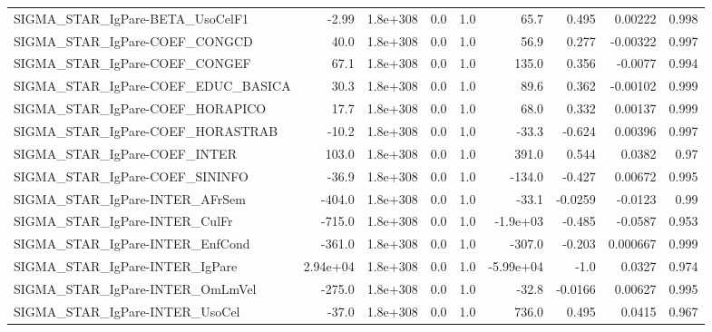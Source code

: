 \begin{tabular}{lrrrrrrrr}
SIGMA\_STAR\_IgPare-BETA\_UsoCelF1       &       -2.99 &     1.8e+308 &     0.0 &      1.0 &       65.7 &       0.495 &      0.00222 &         0.998 \\
SIGMA\_STAR\_IgPare-COEF\_CONGCD         &        40.0 &     1.8e+308 &     0.0 &      1.0 &       56.9 &       0.277 &     -0.00322 &         0.997 \\
SIGMA\_STAR\_IgPare-COEF\_CONGEF         &        67.1 &     1.8e+308 &     0.0 &      1.0 &      135.0 &       0.356 &      -0.0077 &         0.994 \\
SIGMA\_STAR\_IgPare-COEF\_EDUC\_BASICA    &        30.3 &     1.8e+308 &     0.0 &      1.0 &       89.6 &       0.362 &     -0.00102 &         0.999 \\
SIGMA\_STAR\_IgPare-COEF\_HORAPICO       &        17.7 &     1.8e+308 &     0.0 &      1.0 &       68.0 &       0.332 &      0.00137 &         0.999 \\
SIGMA\_STAR\_IgPare-COEF\_HORASTRAB      &       -10.2 &     1.8e+308 &     0.0 &      1.0 &      -33.3 &      -0.624 &      0.00396 &         0.997 \\
SIGMA\_STAR\_IgPare-COEF\_INTER          &       103.0 &     1.8e+308 &     0.0 &      1.0 &      391.0 &       0.544 &       0.0382 &          0.97 \\
SIGMA\_STAR\_IgPare-COEF\_SININFO        &       -36.9 &     1.8e+308 &     0.0 &      1.0 &     -134.0 &      -0.427 &      0.00672 &         0.995 \\
SIGMA\_STAR\_IgPare-INTER\_AFrSem        &      -404.0 &     1.8e+308 &     0.0 &      1.0 &      -33.1 &     -0.0259 &      -0.0123 &          0.99 \\
SIGMA\_STAR\_IgPare-INTER\_CulFr         &      -715.0 &     1.8e+308 &     0.0 &      1.0 &   -1.9e+03 &      -0.485 &      -0.0587 &         0.953 \\
SIGMA\_STAR\_IgPare-INTER\_EnfCond       &      -361.0 &     1.8e+308 &     0.0 &      1.0 &     -307.0 &      -0.203 &     0.000667 &         0.999 \\
SIGMA\_STAR\_IgPare-INTER\_IgPare        &    2.94e+04 &     1.8e+308 &     0.0 &      1.0 &  -5.99e+04 &        -1.0 &       0.0327 &         0.974 \\
SIGMA\_STAR\_IgPare-INTER\_OmLmVel       &      -275.0 &     1.8e+308 &     0.0 &      1.0 &      -32.8 &     -0.0166 &      0.00627 &         0.995 \\
SIGMA\_STAR\_IgPare-INTER\_UsoCel        &       -37.0 &     1.8e+308 &     0.0 &      1.0 &      736.0 &       0.495 &       0.0415 &         0.967 \\

\end{tabular}
